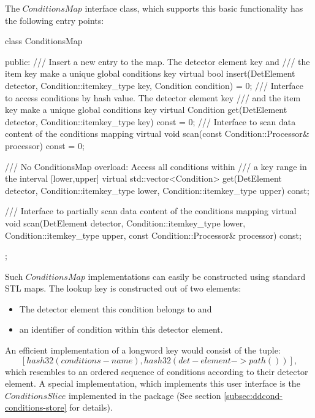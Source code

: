 \documentclass[10pt,a4paper]{article}
\begin{document}
\noindent
The $ConditionsMap$ interface class, which supports this basic functionality
has the following entry points:
\begin{unnumberedcode}
  class ConditionsMap   {
  public:
    /// Insert a new entry to the map. The detector element key and 
    /// the item key make a unique global conditions key
    virtual bool insert(DetElement         detector,
                        Condition::itemkey_type key,
                        Condition          condition) = 0;
    /// Interface to access conditions by hash value. The detector element key 
    /// and the item key make a unique global conditions key
    virtual Condition get(DetElement              detector,
                          Condition::itemkey_type key) const = 0;
    /// Interface to scan data content of the conditions mapping
    virtual void scan(const Condition::Processor& processor) const = 0;

    /// No ConditionsMap overload: Access all conditions within 
    /// a key range in the interval [lower,upper]
    virtual std::vector<Condition> get(DetElement              detector,
                                       Condition::itemkey_type lower,
                                       Condition::itemkey_type upper)  const;
      
    /// Interface to partially scan data content of the conditions mapping
    virtual void scan(DetElement                  detector,
                      Condition::itemkey_type     lower,
                      Condition::itemkey_type     upper,
                      const Condition::Processor& processor) const;
  };
\end{unnumberedcode}
Such $ConditionsMap$ implementations can easily be constructed using standard
STL maps. The lookup key is constructed out of two elements:
\begin{itemize}
\item The detector element this condition belongs to and 
\item an identifier of condition within this detector element.
\end{itemize}
An efficient implementation of a longword key would consist of the tuple:
$$
[ hash32(conditions-name) , hash32(det-element->path()) ],
$$
which resembles to an ordered sequence of conditions according to 
their detector element. A special implementation, which implements 
this user interface is the $ConditionsSlice$ implemented in the 
\DDC package (See section \ref{subsec:ddcond-conditions-store} for details).
\end{document}
